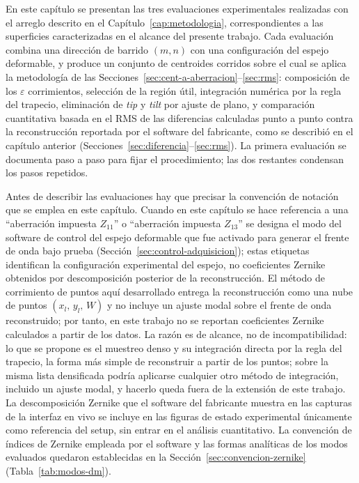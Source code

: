 \documentclass[letterpaper,12pt,oneside]{book}
\begin{document}
En este capítulo se presentan las tres evaluaciones experimentales realizadas con el
arreglo descrito en el Capítulo~\ref{cap:metodologia}, correspondientes a las superficies
caracterizadas en el alcance del presente trabajo. Cada evaluación combina una dirección
de barrido $(m,n)$ con una configuración del espejo deformable, y produce un conjunto de
centroides corridos sobre el cual se aplica la metodología de las
Secciones~\ref{sec:cent-a-aberracion}--\ref{sec:rms}: composición de los $\varepsilon$
corrimientos, selección de la región útil, integración numérica por la regla del trapecio,
eliminación de \textit{tip} y \textit{tilt} por ajuste de plano, y comparación
cuantitativa basada en el RMS de las diferencias calculadas punto a punto contra la
reconstrucción reportada por el software del fabricante, como se describió en el capítulo
anterior (Secciones~\ref{sec:diferencia}--\ref{sec:rms}). La primera evaluación se
documenta paso a paso para fijar el procedimiento; las dos restantes condensan los pasos
repetidos.

Antes de describir las evaluaciones hay que precisar la convención de notación que se
emplea en este capítulo. Cuando en este capítulo se hace referencia a una ``aberración
impuesta $Z_{11}$'' o ``aberración impuesta $Z_{13}$'' se designa el modo del software de
control del espejo deformable que fue activado para generar el frente de onda bajo prueba
(Sección~\ref{sec:control-adquisicion}); estas etiquetas identifican la configuración
experimental del espejo, no coeficientes Zernike obtenidos por descomposición posterior de
la reconstrucción. El método de corrimiento de puntos aquí desarrollado entrega la
reconstrucción como una nube de puntos $(x_l,\,y_l,\,W)$ y no incluye un ajuste modal
sobre el frente de onda reconstruido; por tanto, en este trabajo no se reportan
coeficientes Zernike calculados a partir de los datos. La razón es de alcance, no de
incompatibilidad: lo que se propone es el muestreo denso y su integración directa por la
regla del trapecio, la forma más simple de reconstruir a partir de los puntos; sobre la
misma lista densificada podría aplicarse cualquier otro método de integración, incluido un
ajuste modal, y hacerlo queda fuera de la extensión de este trabajo. La descomposición
Zernike que el software del fabricante muestra en las capturas de la interfaz en vivo se
incluye en las figuras de estado experimental únicamente como referencia del setup, sin
entrar en el análisis cuantitativo. La convención de índices de Zernike empleada por el
software y las formas analíticas de los modos evaluados quedaron establecidas en la
Sección~\ref{sec:convencion-zernike} (Tabla~\ref{tab:modos-dm}).
\end{document}
